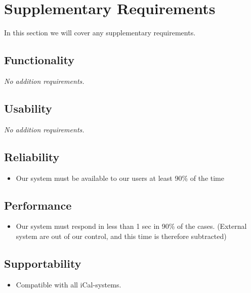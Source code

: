 \section{Supplementary Requirements}
In this section we will cover any supplementary requirements.
\subsection{Functionality}
\textit{No addition requirements.}
\subsection{Usability}
\textit{No addition requirements.}
\subsection{Reliability}
\begin{itemize}
  \item Our system must be available to our users at least 90\% of the time
\end{itemize}
\subsection{Performance}
\begin{itemize}
  \item Our system must respond in less than 1 sec in 90\% of the cases.
    (External system are out of our control, and this time is therefore
    subtracted)
\end{itemize}
\subsection{Supportability}
\begin{itemize}
  \item Compatible with all iCal-systems.
\end{itemize}
\newpage
